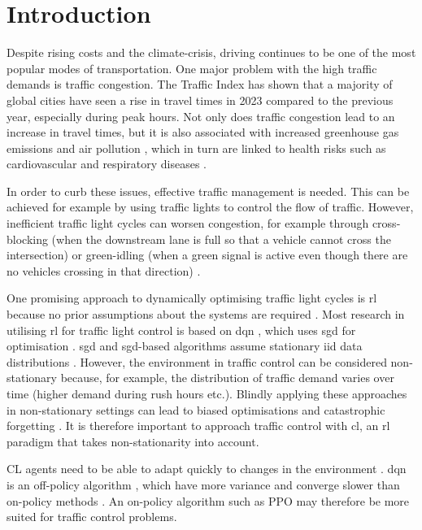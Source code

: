 \chapter{Introduction}

Despite rising costs and the climate-crisis, driving continues to be one of the most popular modes of transportation. One major problem with the high traffic demands is traffic congestion. The \cite{TomTom_2023} Traffic Index has shown that a majority of global cities have seen a rise in travel times in 2023 compared to the previous year, especially during peak hours. Not only does traffic congestion lead to an increase in travel times, but it is also associated with increased greenhouse gas emissions and air pollution \parencite{DoT_2023}, which in turn are linked to health risks such as cardiovascular and respiratory diseases \parencite{WHO_2022}. 

In order to curb these issues, effective traffic management is needed. This can be achieved for example by using traffic lights to control the flow of traffic. However, inefficient traffic light cycles can worsen congestion, for example through cross-blocking (when the downstream lane is full so that a vehicle cannot cross the intersection) or green-idling (when a green signal is active even though there are no vehicles crossing in that direction) \parencite{Rasheed_2020}. 

One promising approach to dynamically optimising traffic light cycles is \gls{rl} because no prior assumptions about the systems are required \parencite{Liu_2023}. Most research in utilising \gls{rl} for traffic light control is based on \gls{dqn} \parencite{Rasheed_2020}, which uses \gls{sgd} for optimisation \parencite{Mnih_2015}. \gls{sgd} and \gls{sgd}-based algorithms assume stationary \gls{iid} data distributions \parencite{Khetarpal_2022}. However, the environment in traffic control can be considered non-stationary because, for example, the distribution of traffic demand varies over time (higher demand during rush hours etc.). Blindly applying these approaches in non-stationary settings can lead to biased optimisations and catastrophic forgetting \parencite{Khetarpal_2022}. It is therefore important to approach traffic control with \gls{cl}, an \gls{rl} paradigm that takes non-stationarity into account.

CL agents need to be able to adapt quickly to changes in the environment \parencite{Khetarpal_2022}. \gls{dqn} is an off-policy algorithm \parencite{Mnih_2015}, which have more variance and converge slower than on-policy methods \parencite{SuttonBarto_2018}. An on-policy algorithm such as PPO \parencite{Schulman_2017} may therefore be more suited for traffic control problems.


